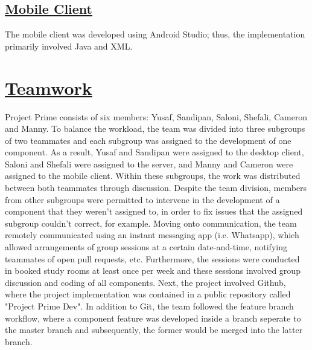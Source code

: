 \documentclass{article}
\begin{document}
\subsection{\underline{Mobile Client}}
The mobile client was developed using Android Studio; thus, the implementation primarily involved Java and XML.

\section{\underline{Teamwork}}
Project Prime consists of six members: Yusaf, Sandipan, Saloni, Shefali, Cameron and Manny. To balance the workload, the team was divided into three subgroups of two teammates and each subgroup was assigned to the development of one component. As a result, Yusaf and Sandipan were assigned to the desktop client, Saloni and Shefali were assigned to the server, and Manny and Cameron were assigned to the mobile client. Within these subgroups, the work was distributed between both teammates through discussion. Despite the team division, members from other subgroups were permitted to intervene in the development of a component that they weren't assigned to, in order to fix issues that the assigned subgroup couldn't correct, for example. Moving onto communication, the team remotely communicated using an instant messaging app (i.e. Whatsapp), which allowed arrangements of group sessions at a certain date-and-time, notifying teammates of open pull requests, etc. Furthermore, the sessions were conducted in booked study rooms at least once per week and these sessions involved group discussion and coding of all components. Next, the project involved Github, where the project implementation was contained in a public repository called "Project Prime Dev". In addition to Git, the team followed the feature branch workflow, where a component feature was developed inside a branch seperate to the master branch and subsequently, the former would be merged into the latter branch.
\end{document}
